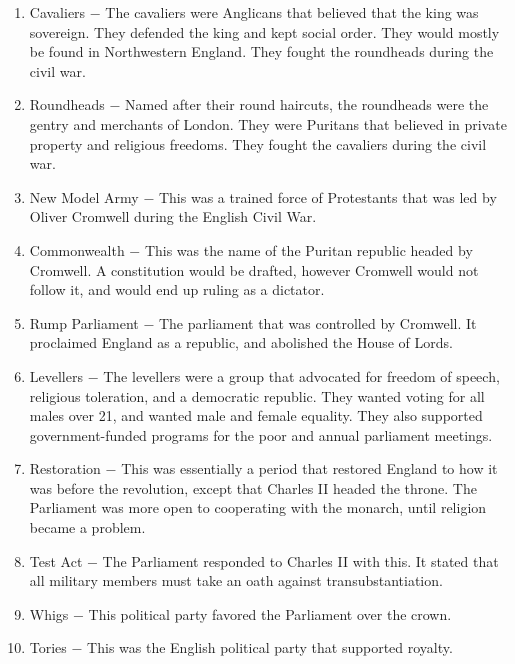 \documentclass[12pt]{article}
\begin{document}
\begin{enumerate}
\item Cavaliers $-$ The cavaliers were Anglicans that believed that the king was sovereign. They defended the king and kept social order. They would mostly be found in Northwestern England. They fought the roundheads during the civil war.

\item Roundheads $-$ Named after their round haircuts, the roundheads were the gentry and merchants of London. They were Puritans that believed in private property and religious freedoms. They fought the cavaliers during the civil war.

\item New Model Army $-$ This was a trained force of Protestants that was led by Oliver Cromwell during the English Civil War.

\item Commonwealth $-$ This was the name of the Puritan republic headed by Cromwell. A constitution would be drafted, however Cromwell would not follow it, and would end up ruling as a dictator.

\item Rump Parliament $-$ The parliament that was controlled by Cromwell. It proclaimed England as a republic, and abolished the House of Lords.

\item Levellers $-$ The levellers were a group that advocated for freedom of speech, religious toleration, and a democratic republic. They wanted voting for all males over 21, and wanted male and female equality. They also supported government-funded programs for the poor and annual parliament meetings.

\item Restoration $-$ This was essentially a period that restored England to how it was before the revolution, except that Charles II headed the throne. The Parliament was more open to cooperating with the monarch, until religion became a problem.

\item Test Act $-$ The Parliament responded to Charles II with this. It stated that all military members must take an oath against transubstantiation.

\item Whigs $-$ This political party favored the Parliament over the crown.

\item Tories $-$ This was the English political party that supported royalty.


\end{enumerate}
\end{document}
